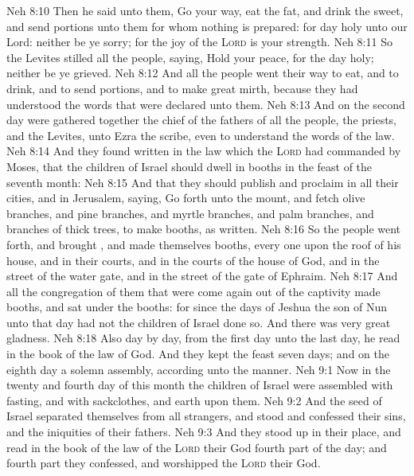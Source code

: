 \vs Neh 8:10 Then he said unto them, Go your way, eat the fat, and drink the sweet, and send portions unto them for whom nothing is prepared: for  day  holy unto our Lord: neither be ye sorry; for the joy of the \textsc{Lord} is your strength.
\vs Neh 8:11 So the Levites stilled all the people, saying, Hold your peace, for the day  holy; neither be ye grieved.
\vs Neh 8:12 And all the people went their way to eat, and to drink, and to send portions, and to make great mirth, because they had understood the words that were declared unto them.
\vs Neh 8:13 And on the second day were gathered together the chief of the fathers of all the people, the priests, and the Levites, unto Ezra the scribe, even to understand the words of the law.
\vs Neh 8:14 And they found written in the law which the \textsc{Lord} had commanded by Moses, that the children of Israel should dwell in booths in the feast of the seventh month:
\vs Neh 8:15 And that they should publish and proclaim in all their cities, and in Jerusalem, saying, Go forth unto the mount, and fetch olive branches, and pine branches, and myrtle branches, and palm branches, and branches of thick trees, to make booths, as  written.
\vs Neh 8:16 So the people went forth, and brought , and made themselves booths, every one upon the roof of his house, and in their courts, and in the courts of the house of God, and in the street of the water gate, and in the street of the gate of Ephraim.
\vs Neh 8:17 And all the congregation of them that were come again out of the captivity made booths, and sat under the booths: for since the days of Jeshua the son of Nun unto that day had not the children of Israel done so. And there was very great gladness.
\vs Neh 8:18 Also day by day, from the first day unto the last day, he read in the book of the law of God. And they kept the feast seven days; and on the eighth day  a solemn assembly, according unto the manner.
\vs Neh 9:1 Now in the twenty and fourth day of this month the children of Israel were assembled with fasting, and with sackclothes, and earth upon them.
\vs Neh 9:2 And the seed of Israel separated themselves from all strangers, and stood and confessed their sins, and the iniquities of their fathers.
\vs Neh 9:3 And they stood up in their place, and read in the book of the law of the \textsc{Lord} their God  fourth part of the day; and  fourth part they confessed, and worshipped the \textsc{Lord} their God.
